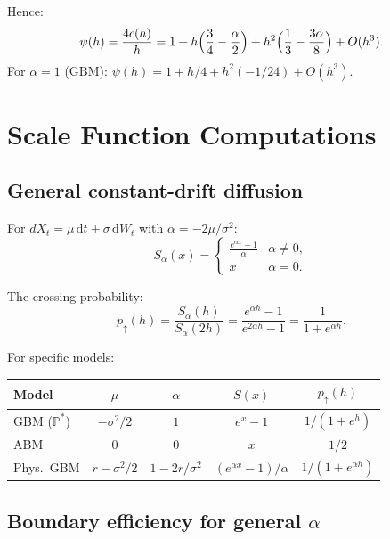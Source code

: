 \documentclass[11pt]{article}
\theoremstyle{definition}
\theoremstyle{remark}
\newcommand{\PP}{\mathbb{P}}
\newcommand{\dd}{\,\mathrm{d}}
\begin{document}
Hence:
\begin{equation}\label{eq:psi_full}
\psi(h) = \frac{4c(h)}{h}
= 1 + h\Bigl(\frac{3}{4} - \frac{\alpha}{2}\Bigr)
+ h^2\Bigl(\frac{1}{3} - \frac{3\alpha}{8}\Bigr) + O(h^3).
\end{equation}
For $\alpha = 1$ (GBM): $\psi(h) = 1 + h/4 + h^2(-1/24) + O(h^3)$.

\section{Scale Function Computations}\label{app:scale}

\subsection{General constant-drift diffusion}

For $dX_t = \mu\dd t + \sigma\dd W_t$ with
$\alpha = -2\mu/\sigma^2$:
\begin{equation}\label{eq:scale_general}
S_\alpha(x) = \begin{cases}
\displaystyle\frac{e^{\alpha x} - 1}{\alpha} & \alpha \ne 0, \\[6pt]
x & \alpha = 0.
\end{cases}
\end{equation}

The crossing probability:
\begin{equation}\label{eq:p_up_general}
p_\uparrow(h) = \frac{S_\alpha(h)}{S_\alpha(2h)}
= \frac{e^{\alpha h} - 1}{e^{2\alpha h} - 1}
= \frac{1}{1 + e^{\alpha h}}.
\end{equation}

For specific models:
\begin{center}
\begin{tabular}{lcccc}
\toprule
Model & $\mu$ & $\alpha$ & $S(x)$ & $p_\uparrow(h)$ \\
\midrule
GBM ($\PP^*$) & $-\sigma^2/2$ & $1$ & $e^x - 1$ & $1/(1+e^h)$ \\
ABM & $0$ & $0$ & $x$ & $1/2$ \\
Phys.\ GBM & $r - \sigma^2/2$ & $1 - 2r/\sigma^2$
& $(e^{\alpha x}-1)/\alpha$ & $1/(1+e^{\alpha h})$ \\
\bottomrule
\end{tabular}
\end{center}

\subsection{Boundary efficiency for general $\alpha$}
\end{document}
